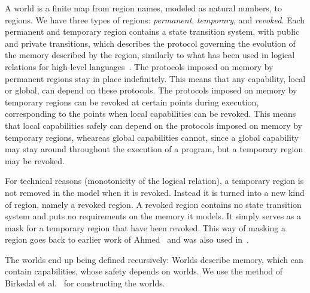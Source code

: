 \documentclass[compsoc,conference,letterpaper,fleqn]{IEEEtran}
\newcommand{\plainview}[1]{\mathrm{#1}}
\newcommand{\perma}{\plainview{perm}}
\newcommand{\temp}{\plainview{temp}}
\newcommand{\revoked}{\plainview{revoked}}
\begin{document}
A world is a finite map from region names, modeled as natural numbers, to regions.
We have three types of regions: \emph{permanent}, \emph{temporary}, and \emph{revoked}.
Each permanent and temporary region contains a state transition system, with
public and private transitions, which describes the protocol governing
the evolution of the memory described by the region, similarly to what
has been used in logical relations for high-level
languages~\cite{Ahmed:popl09,Dreyer:jfp12,Devriese:2016ObjCap}. 
The protocols imposed on memory by permanent regions stay in place
indefinitely. This means that any capability, local or global, can
depend on these protocols. The protocols imposed on memory by temporary
regions can be revoked at certain points during execution,
corresponding to the points when local capabilities can be
revoked. This means that local capabilities safely can depend on the
protocols imposed on memory by temporary regions, wheareas global
capabilities cannot, since a global capability may stay around
throughout the execution of a program, but a temporary region may be
revoked.

For technical reasons (monotonicity of the logical relation), a
temporary region is not removed in the model when it is
revoked. Instead it is turned into a new kind of region, namely a
revoked region. A revoked region contains no state transition
system and puts no requirements on the memory it models. It
simply serves as a mask for a temporary region that have been revoked.
This way of masking a region goes back to earlier work of
Ahmed~\cite{Ahmed2004semantics} and was also used in~\cite{Thamsborg:2011:KLR:2034773.2034831}.


The worlds end up being defined recursively: Worlds describe memory,
which can contain capabilities, whose safety depends on worlds. 
We use the method of Birkedal et
al.~\cite{Birkedal:2011:SKM:1926385.1926401} 
for constructing the worlds.
\end{document}
